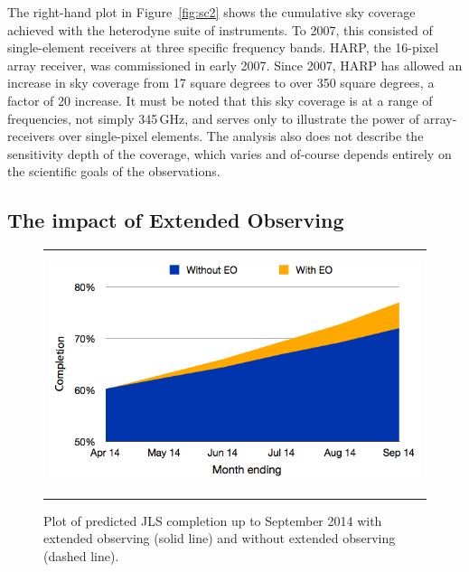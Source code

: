 \documentclass[]{spie}  %
\begin{document}
The right-hand plot in Figure~\ref{fig:sc2} shows the cumulative sky coverage achieved with
the heterodyne suite of instruments. To 2007, this consisted of
single-element receivers at three specific frequency bands. HARP, the
16-pixel array receiver, was commissioned in early 2007. Since 2007,
HARP has allowed an increase in sky coverage from 17 square degrees to
over 350 square degrees, a factor of 20 increase. It must be noted
that this sky coverage is at a range of frequencies, not simply
345\,GHz, and serves only to illustrate the power of array-receivers
over single-pixel elements. The analysis also does not describe the
sensitivity depth of the coverage, which varies and of-course depends
entirely on the scientific goals of the observations.





\subsection{The impact of Extended Observing}\label{sec:eo}
\begin{figure}[ht]
   \begin{center}
   \begin{tabular}{c}
   \includegraphics[height=7cm]{JLSspie2}
   \end{tabular}
   \end{center}
   \caption{\label{fig:eo} Plot of predicted JLS completion up to September 2014 with extended observing (solid line) and without extended observing (dashed line).}
\end{figure}
\end{document}
